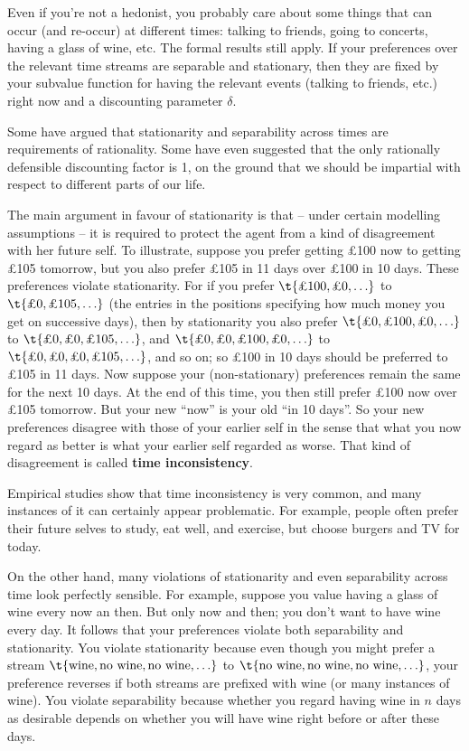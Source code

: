 Even if you're not a hedonist, you probably care about some things
that can occur (and re-occur) at different times: talking to friends,
going to concerts, having a glass of wine, etc. The formal results
still apply. If your preferences over the relevant time streams are
separable and stationary, then they are fixed by your subvalue
function for having the relevant events (talking to friends, etc.)
right now and a discounting parameter $\delta$.

Some have argued that stationarity and separability across times are
requirements of rationality. Some have even suggested that the only
rationally defensible discounting factor is 1, on the ground that we
should be impartial with respect to different parts of our life.

The main argument in favour of stationarity is that -- under certain
modelling assumptions -- it is required to protect the agent from a
kind of disagreement with her future self. To illustrate, suppose you
prefer getting £100 now to getting £105 tomorrow, but you also prefer
£105 in 11 days over £100 in 10 days. These preferences violate
stationarity. For if you prefer $\t{\text{£100}, \text{£0}, \ldots}$
to $\t{\text{£0}, \text{£105}, \ldots}$ (the entries in the positions
specifying how much money you get on successive days), then by
stationarity you also prefer $\t{\text{£0}, \text{£100}, \text{£0},
  \ldots}$ to $\t{\text{£0}, \text{£0}, \text{£105}, \ldots}$, and
$\t{\text{£0}, \text{£0}, \text{£100}, \text{£0}, \ldots}$ to
$\t{\text{£0}, \text{£0}, \text{£0}, \text{£105}, \ldots}$, and so on;
so £100 in 10 days should be preferred to £105 in 11 days. Now suppose
your (non-stationary) preferences remain the same for the next 10
days. At the end of this time, you then still prefer £100 now over £105
tomorrow. But your new ``now'' is your old ``in 10 days''. So your new
preferences disagree with those of your earlier self in the sense that
what you now regard as better is what your earlier self regarded as
worse. That kind of disagreement is called \textbf{time
  inconsistency}.

Empirical studies show that time inconsistency is very common, and
many instances of it can certainly appear problematic. For example,
people often prefer their future selves to study, eat well, and
exercise, but choose burgers and TV for today.

On the other hand, many violations of stationarity and even
separability across time look perfectly sensible. For example, suppose
you value having a glass of wine every now an then. But only now and
then; you don't want to have wine every day. It follows that your
preferences violate both separability and stationarity. You violate
stationarity because even though you might prefer a stream
$\t{\text{wine}, \text{no wine}, \text{no wine}, \ldots}$ to
$\t{\text{no wine}, \text{no wine}, \text{no wine}, \ldots}$, your
preference reverses if both streams are prefixed with wine (or many
instances of wine). You violate separability because whether you
regard having wine in $n$ days as desirable depends on whether you
will have wine right before or after these days. 

